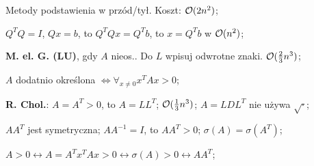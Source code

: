 
\entry
Metody podstawienia w przód/tył. Koszt: $\mathcal{O}(2n^2)$;

\entry
$Q^TQ=I$, $Qx=b$, to $Q^TQx=Q^Tb$, to $x=Q^Tb$ w $\mathcal{O}(n^2)$;




\entry
\textbf{M. el. G. (LU)}, gdy $A$ nieos..
Do $L$ wpisuj odwrotne znaki.
$\mathcal{O}(\frac{2}{3}n^3)$;

\entry
$A$ dodatnio określona $\iff \forall_{x \neq 0} x^TAx>0$;

\entry
\textbf{R. Chol.}:
$A=A^T>0$,
to
$A=LL^T$;
$\mathcal{O}(\frac{1}{3}n^3)$;
$A=LDL^T$
nie używa
$\sqrt{\cdot}$;

\entry
$AA^T$ jest symetryczna;
\entry
$AA^{-1}=I$, to $AA^T>0$;
\entry
$\sigma(A) = \sigma(A^T)$;

\entry
$
A>0
\leftrightarrow A=A^Tx^TAx > 0
\leftrightarrow \sigma(A) > 0
\leftrightarrow AA^T
$;
